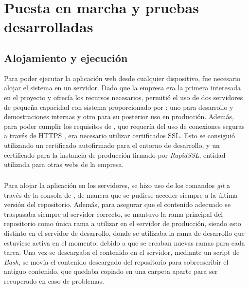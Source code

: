 \documentclass{subfiles}
\begin{document}
    \chapter{Puesta en marcha y pruebas desarrolladas}
    \label{chap:puesta_en_marcha_y_pruebas_desarrolladas}

    \section{Alojamiento y ejecución}
    \label{sec:alojamiento_y_ejecucion}
    Para poder ejecutar la aplicación web desde cualquier dispositivo, fue necesario alojar el sistema en un servidor. Dado que la empresa \silverstorm era la primera interesada en el proyecto y ofrecía los recursos necesarios, permitió el uso de dos servidores de pequeña capacidad con sistema \linux proporcionado por \aws: uno para desarrollo y demostraciones internas y otro para su posterior uso en producción. Además, para poder cumplir los requisitos de \webxr, que requería del uso de conexiones seguras a través de HTTPS \cite{web:webxrrequirements}, era necesario utilizar certificados SSL. Esto se consiguió utilizando un certificado autofirmado para el entorno de desarrollo, y un certificado para la instancia de producción firmado por \textit{RapidSSL}, entidad utilizada para otras webs de la empresa.

    \paragraph{}
    Para alojar la aplicación en los servidores, se hizo uso de los comandos \textit{git} a través de la consola de \linux, de manera que se pudiese acceder siempre a la última versión del repositorio. Además, para asegurar que el contenido adecuado se traspasaba siempre al servidor correcto, se mantuvo la rama principal del repositorio como única rama a utilizar en el servidor de producción, siendo esto distinto en el servidor de desarrollo, donde se utilizaba la rama de desarrollo que estuviese activa en el momento, debido a que se creaban nuevas ramas para cada tarea. Una vez se descargaba el contenido en el servidor, mediante un script de \textit{Bash}, se movía el contenido descargado del repositorio para sobreescribir el antiguo contenido, que quedaba copiado en una carpeta aparte para ser recuperado en caso de problemas.
\end{document}
